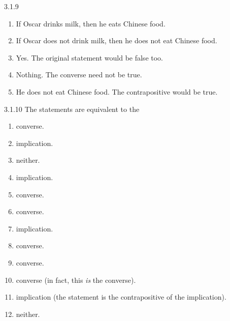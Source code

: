\documentclass[11pt,]{book}
\theoremstyle{ptxplainnotitle}
\theoremstyle{ptxplaintitle}
\theoremstyle{ptxdefinitionnotitle}
\theoremstyle{ptxdefinitiontitle}
\theoremstyle{ptxdefinitionnotitle}
\theoremstyle{ptxdefinitiontitle}
\theoremstyle{ptxdefinitionnotitle}
\theoremstyle{ptxdefinitiontitle}
\theoremstyle{ptxdefinitiontitlenonumber}
\theoremstyle{ptxdefinitiontitlenonumber}
\numberwithin{equation}{chapter}
\begin{document}
\begin{divisionexercise}{3.1.9}
\textbf{}\leavevmode%
\begin{enumerate}[label=(\alph*)]
\item\hypertarget{li-1051}{}\hypertarget{p-2117}{}%
If Oscar drinks milk, then he eats Chinese food.%
\item\hypertarget{li-1052}{}\hypertarget{p-2118}{}%
If Oscar does not drink milk, then he does not eat Chinese food.%
\item\hypertarget{li-1053}{}\hypertarget{p-2119}{}%
Yes. The original statement would be false too.%
\item\hypertarget{li-1054}{}\hypertarget{p-2120}{}%
Nothing. The converse need not be true.%
\item\hypertarget{li-1055}{}\hypertarget{p-2121}{}%
He does not eat Chinese food. The contrapositive would be true.%
\end{enumerate}
\end{divisionexercise}%
\begin{divisionexercise}{3.1.10}
\textbf{}\hypertarget{p-2135}{}%
The statements are equivalent to the\textellipsis{} \leavevmode%
\begin{enumerate}[label=(\alph*)]
\item\hypertarget{li-1068}{}\hypertarget{p-2136}{}%
converse.%
\item\hypertarget{li-1069}{}\hypertarget{p-2137}{}%
implication.%
\item\hypertarget{li-1070}{}\hypertarget{p-2138}{}%
neither.%
\item\hypertarget{li-1071}{}\hypertarget{p-2139}{}%
implication.%
\item\hypertarget{li-1072}{}\hypertarget{p-2140}{}%
converse.%
\item\hypertarget{li-1073}{}\hypertarget{p-2141}{}%
converse.%
\item\hypertarget{li-1074}{}\hypertarget{p-2142}{}%
implication.%
\item\hypertarget{li-1075}{}\hypertarget{p-2143}{}%
converse.%
\item\hypertarget{li-1076}{}\hypertarget{p-2144}{}%
converse.%
\item\hypertarget{li-1077}{}\hypertarget{p-2145}{}%
converse (in fact, this \emph{is} the converse).%
\item\hypertarget{li-1078}{}\hypertarget{p-2146}{}%
implication (the statement is the contrapositive of the implication).%
\item\hypertarget{li-1079}{}\hypertarget{p-2147}{}%
neither.%
\end{enumerate}
%
\end{divisionexercise}%
\end{document}
